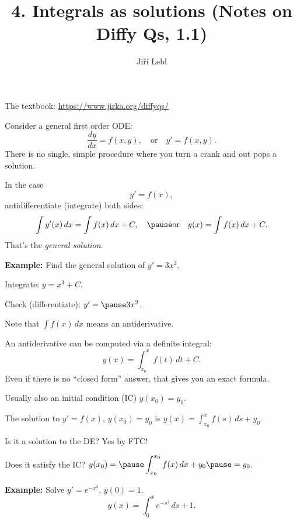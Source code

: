 \documentclass[10pt,aspectratio=169]{beamer}
\author{Ji\v{r}\'i Lebl}
\institute[OSU]{%
Oklahoma State University%
}
\title{4. Integrals as solutions (Notes on Diffy Qs, 1.1)}
\date{}
\begin{document}
\begin{frame}
\titlepage


\begin{center}
The textbook: \url{https://www.jirka.org/diffyqs/}
\end{center}
\end{frame}

\begin{frame}
Consider a general first order ODE:
\[
\frac{dy}{dx} = f(x,y) ,
\quad\text{or}\quad
y' = f(x,y) .
\]
\pause
There is no single, simple procedure where you turn a crank and out pops a
solution.

\medskip
\pause

In the case
\[
y' = f(x) ,
\]
\pause
antidifferentiate (integrate) both sides:
\[
\int y'(x) \,dx = \int f(x) \,dx + C ,
\quad\pause\text{or}\quad
y(x) = \int f(x) \,dx + C .
\]
\pause
That's the \emph{general solution}.

\medskip
\pause

\textbf{Example:}
Find the general solution of $y' = 3 x^2$.

\medskip
\pause

Integrate:\quad
$y = x^3 + C$.

\medskip
\pause

Check (differentiate):\quad
$y' = \pause 3x^2$.
\quad
{\Large\checkmark}
\end{frame}

\begin{frame}
Note that $\int f(x) \, dx$ means an antiderivative.

\medskip
\pause

An antiderivative can be computed via a definite integral:
\[
y(x) = \int_{x_0}^x f(t) \,dt + C .
\]
\pause
Even if there is no ``closed form'' answer, that gives you
an exact formula.

\medskip
\pause

Usually also an initial condition (IC) \quad $y(x_0) = y_0$.

\medskip
\pause

The solution to $y' = f(x)$, $y(x_0)=y_0$ is
\quad
$\displaystyle
y(x) = \int_{x_0}^x f(s) \,ds + y_0$.

\medskip
\pause

Is it a solution to the DE?
\pause
Yes by FTC!

\medskip
\pause

Does it satisfy the IC?
\quad
\pause
$\displaystyle y(x_0) = \pause \int_{x_0}^{x_0} f(x)\,dx + y_0 \pause = y_0$.
\quad
{\Large\checkmark}

\medskip
\pause

\textbf{Example:}
Solve
$y' = e^{-x^2}$, $y(0) = 1$.
\pause
\[
y(x) = \int_0^x e^{-s^2} \,ds + 1 .
\]
\end{frame}
\end{document}
